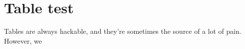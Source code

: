 \documentclass[float=false, crop=false]{standalone}
\begin{document}
\section{Table test}\label{sec:tabletest}
Tables are always hackable, and they're sometimes the source of a lot of pain. However, we 
\end{document}
